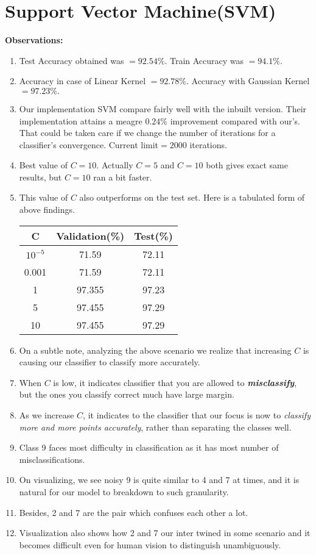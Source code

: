 \documentclass{article}
\newcommand{\bld}[1]{\textbf{#1}}
\newcommand{\ital}[1]{\textit{#1}}
\newcommand{\italb}[1]{\textbf{\textit{#1}}}
\begin{document}
\section*{Support Vector Machine(SVM)}
\bld{Observations:}
\begin{enumerate}
	\item Test Accuracy obtained was $=92.54\%.$ Train Accuracy was $=94.1\%$.
	\item Accuracy in case of Linear Kernel $=92.78\%.$ Accuracy with Gaussian Kernel $=97.23\%.$
	\item Our implementation SVM compare fairly well with the inbuilt version. Their implementation attains a meagre $0.24\%$ improvement compared with our's. That could be taken care if we change the number of iterations for a classifier's convergence. Current limit$=2000$ iterations.
	\item Best value of $C=10$. Actually $C=5$ and $C=10$ both gives exact same results, but $C=10$ ran a bit faster.
	\item This value of $C$ also outperforms on the test set. Here is a tabulated form of above findings.
\begin{center}
 \begin{tabular}{||c|c|c||} 
 \hline
 C & Validation(\%) & Test(\%) \\ [0.5ex] 
 \hline\hline
 $10^{-5}$ & 71.59 & 72.11\\ 
 \hline
 0.001 & 71.59 & 72.11\\
 \hline
 1 & 97.355 & 97.23\\
 \hline
 5 & 97.455 & 97.29\\
 \hline
 10 & 97.455 & 97.29\\ [1ex] 
 \hline
\end{tabular}
\end{center}
	\item On a subtle note, analyzing the above scenario we realize that increasing $C$ is causing our classifier to classify more accurately.
	\item When $C$ is low, it indicates classifier that you are allowed to \italb{misclassify}, but the ones you classify correct much have large margin.
	\item As we increase $C$, it indicates to the classifier that our focus is now to \ital{classify more and more points accurately}, rather than separating the classes well.
	\item Class 9 faces most difficulty in classification as it has most number of misclassifications. 
	\item On visualizing, we see noisy 9 is quite similar to 4 and 7 at times, and it is natural for our model to breakdown to such granularity.
	\item Besides, 2 and 7 are the pair which confuses each other a lot.
	\item Visualization also shows how 2 and 7 our inter twined in some scenario and it becomes difficult even for human vision to distinguish unambiguously.
\end{enumerate}
\end{document}
